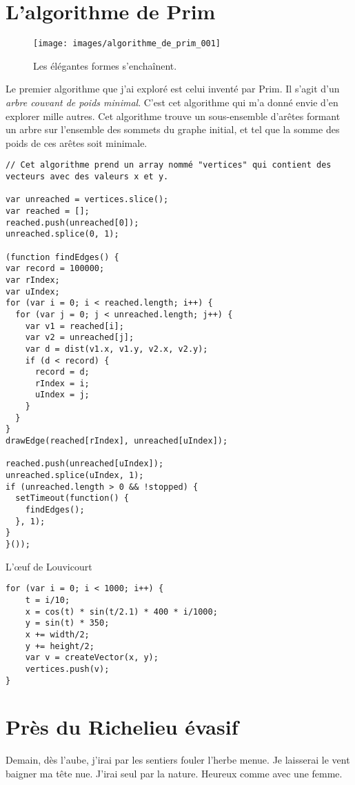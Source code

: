 \chapter{L'algorithme de Prim}
\begin{figure}[h]
\texttt{[image: images/algorithme\_de\_prim\_001]}
\caption{Les élégantes formes s'enchaînent.}
\end{figure}

Le premier algorithme que j'ai exploré est celui inventé par Prim. Il s'agit d'un \textit{arbre couvant de poids minimal}. C'est cet algorithme qui m'a donné envie d'en explorer mille autres. Cet algorithme trouve un sous-ensemble d'arêtes formant un arbre sur l'ensemble des sommets du graphe initial, et tel que la somme des poids de ces arêtes soit minimale. 

\newpage
\begin{lstlisting}
// Cet algorithme prend un array nommé "vertices" qui contient des vecteurs avec des valeurs x et y.

var unreached = vertices.slice();
var reached = [];
reached.push(unreached[0]);
unreached.splice(0, 1);

(function findEdges() {
var record = 100000;
var rIndex;
var uIndex;
for (var i = 0; i < reached.length; i++) {
  for (var j = 0; j < unreached.length; j++) {
    var v1 = reached[i];
    var v2 = unreached[j];
    var d = dist(v1.x, v1.y, v2.x, v2.y);
    if (d < record) {
      record = d;
      rIndex = i;
      uIndex = j;
    }
  }
}
drawEdge(reached[rIndex], unreached[uIndex]);

reached.push(unreached[uIndex]);
unreached.splice(uIndex, 1);
if (unreached.length > 0 && !stopped) {
  setTimeout(function() {
    findEdges();
  }, 1);
}
}());
\end{lstlisting}
L'\oe{}uf de Louvicourt
\begin{lstlisting}
for (var i = 0; i < 1000; i++) {
    t = i/10;
    x = cos(t) * sin(t/2.1) * 400 * i/1000;
    y = sin(t) * 350;
    x += width/2;
    y += height/2;
    var v = createVector(x, y);
    vertices.push(v);
}
\end{lstlisting}


\chapter{Près du Richelieu évasif}
Demain, dès l'aube, j'irai par les sentiers fouler l'herbe menue. Je laisserai le vent baigner ma tête nue. J'irai seul par la nature. Heureux comme avec une femme.
